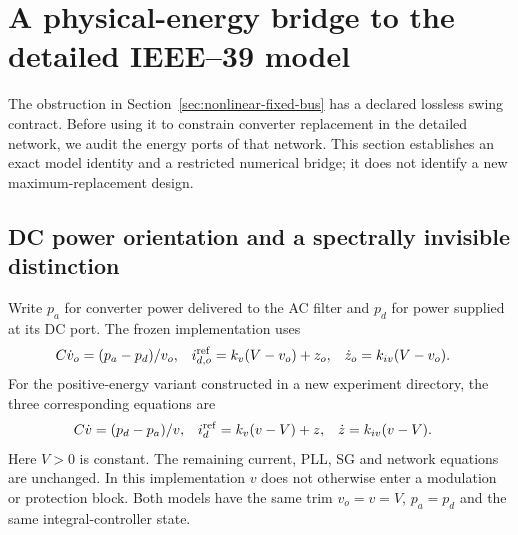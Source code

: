\section{A physical-energy bridge to the detailed IEEE--39 model}
\label{sec:physical-energy-bridge}

The obstruction in Section~\ref{sec:nonlinear-fixed-bus} has a declared
lossless swing contract. Before using it to constrain converter replacement
in the detailed network, we audit the energy ports of that network. This
section establishes an exact model identity and a restricted numerical
bridge; it does not identify a new maximum-replacement design.

\subsection{DC power orientation and a spectrally invisible distinction}
Write $p_a$ for converter power delivered to the AC filter and $p_d$ for
power supplied at its DC port. The frozen implementation uses
\begin{align}
 C\dot v_o&=(p_a-p_d)/v_o,&
 i_{d,o}^{\rm ref}&=k_v(V-v_o)+z_o,&
 \dot z_o&=k_{iv}(V-v_o).\label{eq:legacy-dc-bridge}
\end{align}
For the positive-energy variant constructed in a new experiment directory,
the three corresponding equations are
\begin{align}
 C\dot v&=(p_d-p_a)/v,&
 i_d^{\rm ref}&=k_v(v-V)+z,&
 \dot z&=k_{iv}(v-V).\label{eq:physical-dc-bridge}
\end{align}
Here $V>0$ is constant. The remaining current, PLL, SG and network equations
are unchanged. In this implementation $v$ does not otherwise enter a
modulation or protection block. Both models have the same trim
$v_o=v=V$, $p_a=p_d$ and the same integral-controller state.

